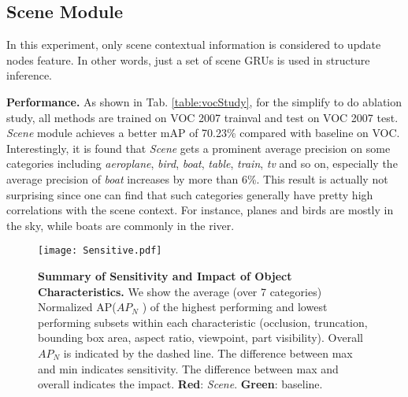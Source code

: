 \documentclass[10pt,twocolumn,letterpaper]{article}
\begin{document}
{\begin{table}
\caption{{\bf Ablation Study on COCO test-dev 2015.} All methods are trained on COCO train set. {\bf Baseline}: Faster R-CNN our trained. {\bf {\em Scene}}: only using scene context. {\bf {\em Edge}}: only using object-object relationships.}
\begin{center}
\vspace{-2.5ex}
\end{center}
\label{table:cocoRes}
\vspace{-2.5ex}
\end{table}

\subsection{Scene Module}
In this experiment, only scene contextual information is considered to update nodes feature. In other words, just a set of scene GRUs is used in structure inference. 

{\bf Performance.} As shown in Tab. \ref{table:vocStudy}, for the simplify to do ablation study, all methods are trained on VOC 2007 trainval and test on VOC 2007 test. {\em Scene} module achieves a better mAP of 70.23\% compared with baseline on VOC. Interestingly, it is found that {\em Scene} gets a prominent average precision on some categories including {\em aeroplane}, {\em bird}, {\em boat}, {\em table}, {\em train}, {\em tv} and so on, especially the average precision of {\em boat} increases by more than 6\%. This result is actually not surprising since one can find that such categories generally have pretty high correlations with the scene context. For instance, planes and birds are mostly in the sky, while boats are commonly in the river.

\begin{figure}[t]
\centering
 \texttt{[image: Sensitive.pdf]}
    \caption{{\bf Summary of Sensitivity and Impact of Object Characteristics.} We show the average (over 7 categories) Normalized AP($AP_N$ \cite{Error}) of the highest performing and lowest performing subsets within each characteristic (occlusion, truncation, bounding box area, aspect ratio, viewpoint, part visibility). Overall $AP_N$ is indicated by the dashed line. The difference between max and min indicates sensitivity. The difference between max and overall indicates the impact. {\bf Red}: {\em Scene}. {\bf Green}: baseline.}
\label{fig:impact}


\end{figure}}
\end{document}
